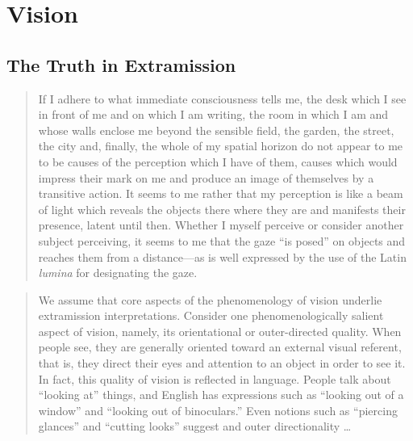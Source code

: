 \chapter{Vision} %
\label{cha:vision}

\section{The Truth in Extramission} %
\label{sec:the_truth_in_extramission}

\begin{quote}
	If I adhere to what immediate consciousness tells me, the desk which I see in front of me and on which I am writing, the room in which I am and whose walls enclose me beyond the sensible field, the garden, the street, the city and, finally, the whole of my spatial horizon do not appear to me to be causes of the perception which I have of them, causes which would impress their mark on me and produce an image of themselves by a transitive action. It seems to me rather that my perception is like a beam of light which reveals the objects there where they are and manifests their presence, latent until then. Whether I myself perceive or consider another subject perceiving, it seems to me that the gaze ``is posed'' on objects and reaches them from a distance---as is well expressed by the use of the Latin \emph{lumina} for designating the gaze. \citep[185]{Merleau-Ponty:1967fj}
\end{quote}


\begin{quote}
	We assume that core aspects of the phenomenology of vision underlie extramission interpretations. Consider one phenomenologically salient aspect of vision, namely, its orientational or outer-directed quality. When people see, they are generally oriented toward an external visual referent, that is, they direct their eyes and attention to an object in order to see it. In fact, this quality of vision is reflected in language. People talk about ``looking at'' things, and English has expressions such as ``looking out of a window'' and ``looking out of binoculars.'' Even notions such as ``piercing glances'' and ``cutting looks'' suggest and outer directionality \ldots\ \citep[140]{Winer:1996as}
\end{quote}


